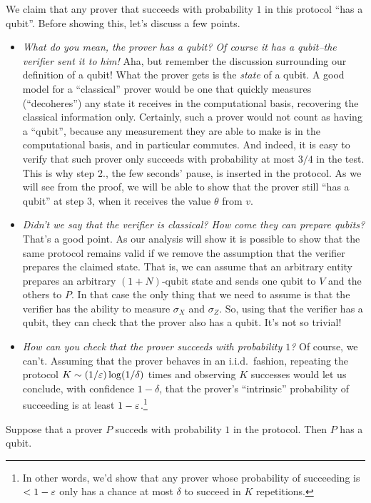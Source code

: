 We claim that any prover that succeeds with probability $1$ in this protocol ``has a qubit''. Before showing this, let's discuss a few points. 
\begin{itemize}
\item \emph{What do you mean, the prover has a qubit? Of course it has a qubit--the verifier sent it to him!} Aha, but remember the discussion surrounding our definition of a qubit! What the prover gets is the \emph{state} of a qubit. A good model for a ``classical'' prover would be one that quickly measures (``decoheres'') any state it receives in the computational basis, recovering the classical information only. Certainly, such a prover would not count as having a ``qubit'', because any measurement they are able to make is in the computational basis, and in particular commutes. And indeed, it is easy to verify that such prover only succeeds with probability at most $3/4$ in the test. This is why step 2., the few seconds' pause, is inserted in the protocol. As we will see from the proof, we will be able to show that the prover still ``has a qubit'' at step 3, when it receives the value $\theta$ from $v$. 
\item \emph{Didn't we say that the verifier is classical? How come they can prepare qubits?} That's a good point. As our analysis will show it is possible to show that the same protocol remains valid if we remove the assumption that the verifier prepares the claimed state. That is, we can assume that an arbitrary entity prepares an arbitrary $(1+N)$-qubit state and sends one qubit to $V$ and the others to $P$. In that case the only thing that we need to assume is that the verifier has the ability to measure $\sigma_X$ and $\sigma_Z$. So, using that the verifier has a qubit, they can check that the prover also has a qubit. It's not so trivial!
\item \emph{How can you check that the prover succeeds with probability $1$?} Of course, we can't. Assuming that the prover behaves in an i.i.d.\ fashion, repeating the protocol $ K \sim (1/\varepsilon)\log (1/\delta)$ times and observing $K$ successes would let us conclude, with confidence $1-\delta$, that the prover's ``intrinsic'' probability of succeeding is at least $1-\varepsilon$.\footnote{In other words, we'd show that any prover whose probability of succeeding is $<1-\varepsilon$ only has a chance at most $\delta$ to succeed in $K$ repetitions.}
\end{itemize}

\begin{lemma}\label{lem:qubit-test-1}
Suppose that a prover $P$ succeds with probability $1$ in the protocol. Then $P$ has a qubit. 
\end{lemma}

